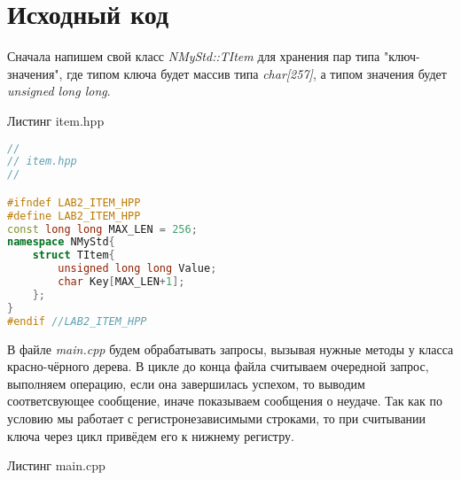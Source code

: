 \section{Исходный код}
Сначала напишем свой класс \textit{NMyStd::TItem} для хранения пар типа "ключ-значения",
где типом ключа будет массив типа \textit{char[257]}, а типом значения будет \textit{unsigned long long}.
\begin{center}Листинг item.hpp\end{center} 
\begin{lstlisting}[language=C++]
//
// item.hpp
//

#ifndef LAB2_ITEM_HPP
#define LAB2_ITEM_HPP
const long long MAX_LEN = 256;
namespace NMyStd{
    struct TItem{
        unsigned long long Value;
        char Key[MAX_LEN+1];
    };
}
#endif //LAB2_ITEM_HPP
\end{lstlisting}
В файле \textit{main.cpp} будем обрабатывать запросы, вызывая нужные методы у класса красно-чёрного дерева. В цикле  до конца файла считываем очередной запрос, выполняем операцию,
если она завершилась успехом, то выводим соответсвующее сообщение, иначе показываем сообщения о неудаче. Так как по условию мы работает с регистронезависимыми строками, то при считывании ключа через цикл привёдем его к нижнему регистру.
\begin{center}Листинг main.cpp\end{center}
